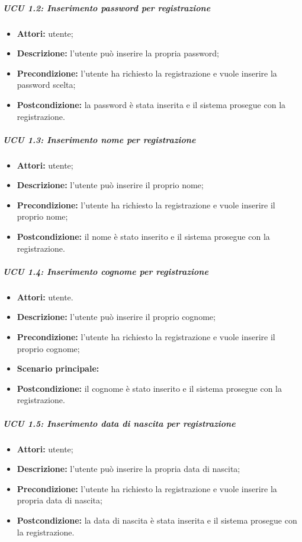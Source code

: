 \subparagraph{UCU 1.2: Inserimento password per registrazione}
\begin{itemize}
	\item \textbf{Attori:} utente;
	\item \textbf{Descrizione:} l'utente può inserire la propria password;
	\item \textbf{Precondizione:} l'utente ha richiesto la registrazione e vuole inserire la password scelta;
	\item \textbf{Postcondizione:} la password è stata inserita e il sistema prosegue con la registrazione.
\end{itemize}

\subparagraph{UCU 1.3: Inserimento nome per registrazione}
\begin{itemize}
	\item \textbf{Attori:} utente;
	\item \textbf{Descrizione:} l'utente può inserire il proprio nome;
	\item \textbf{Precondizione:} l'utente ha richiesto la registrazione e vuole inserire il proprio nome;
	\item \textbf{Postcondizione:} il nome è stato inserito e il sistema prosegue con la registrazione.
\end{itemize}

\subparagraph{UCU 1.4: Inserimento cognome per registrazione}
\begin{itemize}
	\item \textbf{Attori:} utente.
	\item \textbf{Descrizione:} l'utente può inserire il proprio cognome;
	\item \textbf{Precondizione:} l'utente ha richiesto la registrazione e vuole inserire il proprio cognome;
	\item \textbf{Scenario principale:}
	\item \textbf{Postcondizione:} il cognome è stato inserito e il sistema prosegue con la registrazione.
\end{itemize}

\subparagraph{UCU 1.5: Inserimento data di nascita per registrazione}
\begin{itemize}
	\item \textbf{Attori:} utente;
	\item \textbf{Descrizione:} l'utente può inserire la propria data di nascita;
	\item \textbf{Precondizione:} l'utente ha richiesto la registrazione e vuole inserire la propria data di nascita;
	\item \textbf{Postcondizione:} la data di nascita è stata inserita e il sistema prosegue con la registrazione.
\end{itemize}

